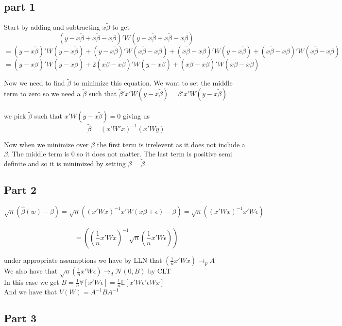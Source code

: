 \documentclass[11pt]{article}
\newcommand{\plim}{\rightarrow_{p}}
\begin{document}
\subsection{part 1}

Start by adding and subtracting $x \tilde{\beta}$ to get 
$$ (y-x\tilde{\beta} + x\tilde{\beta} - x\beta)'W(y-x\tilde{\beta} + x\tilde{\beta} - x\beta) $$
$$ = (y-x\tilde{\beta})'W(y-x\tilde{\beta}) + (y-x\tilde{\beta})'W(x\tilde{\beta} - x\beta) + (x\tilde{\beta} - x\beta)'W(y-x\tilde{\beta}) + (x\tilde{\beta} - x\beta)'W(x\tilde{\beta} - x\beta)$$
$$ = (y-x\tilde{\beta})'W(y-x\tilde{\beta}) + 2(x\tilde{\beta} - x\beta)'W(y-x\tilde{\beta}) + (x\tilde{\beta} - x\beta)'W(x\tilde{\beta} - x\beta)$$

Now we need to find $\tilde{\beta}$ to minimize this equation. We want to set the middle term to zero so we need a $\tilde{\beta}$ such that $\tilde{\beta}'x'W(y-x\tilde{\beta}) = \beta'x'W(y-x\tilde{\beta})$
\\ \\ 
we pick $\tilde{\beta}$ such that $x'W(y-x\tilde{\beta}) = 0$ giving us $$\tilde{\beta}=(x'W'x)^{-1}(x'Wy)$$

Now when we minimize over $\beta$ the first term is irrelevent as it does not include a $\beta$. The middle term is 0 so it does not matter. The last term is positive semi definite and so it is minimized by setting $\beta = \tilde{\beta}$

\subsection{Part 2}

$$ \sqrt{n} (\hat{\beta}(w)- \beta) = \sqrt{n}((x'Wx)^{-1}x'W(x\beta+\epsilon)-\beta)  
= \sqrt{n}((x'Wx)^{-1}x'W \epsilon)$$ \\
$$ = ((\frac{1}{n}x'Wx)^{-1} \sqrt{n} (\frac{1}{n} x'W\epsilon))$$

under appropriate assumptions we have by LLN that $ (\frac{1}{n}x'Wx) \plim A $ \\
We also have that $  \sqrt{n} (\frac{1}{n} x'W\epsilon) \rightarrow_{d} \mathcal{N}(0,B)$ by CLT  \\
In this case we get $ B = \frac{1}{n}  \mathbb{V}[x'W\epsilon] = \frac{1}{n} \mathbb{E}[x'W\epsilon'\epsilon Wx] $\\
And we have that $ V(W) = A^{-1}BA^{-1} $
 
\subsection{Part 3}
\end{document}
